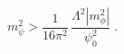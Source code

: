\begin{equation}
\label{eq:masscor2}
m_{\psi}^2 > \frac{1}{16\pi^2}\, \frac{\Lambda^2 |m_{\phi}^2|}{\psi_0^2} \;.
\end{equation}

